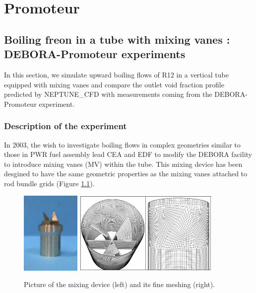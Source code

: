 
\chapter{Promoteur} %

\label{ch:promoteur} %




\section{Boiling freon in a tube with mixing vanes : DEBORA-Promoteur experiments}
\label{sec:deb_prom}

In this section, we simulate upward boiling flows of R12 in a vertical tube equipped with mixing vanes and compare the outlet void fraction profile predicted by NEPTUNE\_CFD with measurements coming from the DEBORA-Promoteur experiment.

\subsection{Description of the experiment}

In 2003, the wish to investigate boiling flows in complex geometries similar to those in PWR fuel assembly lead CEA and EDF to modify the DEBORA facility to introduce mixing vanes (MV) within the tube. This mixing device has been desgined to have the same geometric properties as the mixing vanes attached to rod bundle grids (Figure \ref{fig:promoteur}).

%
\begin{figure}[!htb]
\centering
\includegraphics[height=4cm]{img/DEBORA-Promoteur/prom_pic.png}
\includegraphics[height=4cm]{img/DEBORA-Promoteur/medium_mesh.PNG}
\caption{Picture of the mixing device (left) and its fine meshing (right).}
\label{fig:promoteur}
\end{figure}
%

